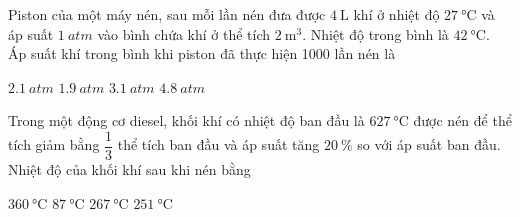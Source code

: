\begin{ex}
	Piston của một máy nén, sau mỗi lần nén đưa được $\SI{4}{\liter}$ khí ở nhiệt độ $\SI{27}{\celsius}$ và áp suất $\SI{1}{atm}$ vào bình chứa khí ở thể tích $\SI{2}{\meter^3}$. Nhiệt độ trong bình là $\SI{42}{\celsius}$. Áp suất khí trong bình khi piston đã thực hiện 1000 lần nén là
	
	\choice
	{\True $\SI{2.1}{atm}$}
	{$\SI{1.9}{atm}$}
	{$\SI{3.1}{atm}$}
	{$\SI{4.8}{atm}$}
\end{ex}
\begin{ex}
	Trong một động cơ diesel, khối khí có nhiệt độ ban đầu là $\SI{627}{\celsius}$ được nén để thể tích giảm bằng $\dfrac{1}{3}$ thể tích ban đầu và áp suất tăng $\SI{20}{\percent}$ so với áp suất ban đầu. Nhiệt độ của khối khí sau khi nén bằng
	
	\choice
	{$\SI{360}{\celsius}$}
	{\True $\SI{87}{\celsius}$}
	{$\SI{267}{\celsius}$}
	{$\SI{251}{\celsius}$}
\end{ex}
